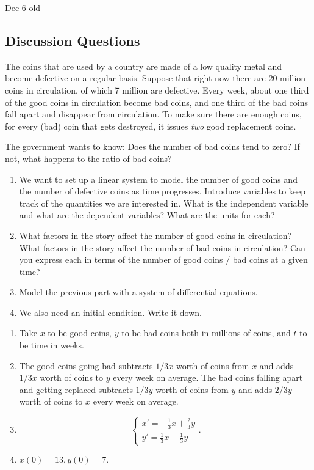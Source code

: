 \documentclass[12pt]{amsart}
\numberwithin{equation}{section}
\theoremstyle{plain} %
\newcommand{\Dec}[1]{Dec #1 old}
\theoremstyle{definition}
\theoremstyle{remark}
\begin{document}
\Dec{6}

\subsection*{Discussion Questions}

The coins that are used by a country are made of a low quality metal and become defective on a regular basis. Suppose that right now there are 20 million coins in circulation, of which 7 million are defective. Every week, about one third of the good coins in circulation become bad coins, and one third of the bad coins fall apart and disappear from circulation.
To make sure there are enough coins, for every (bad) coin that gets destroyed, it issues \emph{two} good replacement coins.

The government wants to know: Does the number of bad coins tend to zero? If not, what happens to the ratio of bad coins?


\begin{enumerate}
\item We want to set up a linear system to model the number of good coins and the number of defective coins as time progresses. Introduce variables to keep track of the quantities we are interested in. 
What is the independent variable and what are the dependent variables? What are the units for each?
\item What factors in the story affect the number of good coins in circulation? What factors in the story affect the number of bad coins in circulation? Can you express each in terms of the number of good coins / bad coins at a given time?
\item Model the previous part with a system of differential equations.
\item We also need an initial condition. Write it down.
\end{enumerate}

\begin{framed}
\begin{enumerate}
\item Take $x$ to be good coins, $y$ to be bad coins both in millions of coins, and $t$ to be time in weeks.
\item The good coins going bad subtracts $1/3 x$ worth of coins from $x$ and adds $1/3 x$ worth of coins to $y$ every week on average. The bad coins falling apart and getting replaced subtracts $1/3 y$ worth of coins from $y$ and adds $2/3 y$ worth of coins to $x$ every week on average.
\item \[ \begin{cases} x' = -\frac{1}{3}x + \frac{2}{3}y \\ y' = \frac{1}{3} x - \frac{1}{3} y\end{cases}.\]
\item $x(0)=13, y(0)=7$.
\end{enumerate}
\end{framed}
\end{document}
